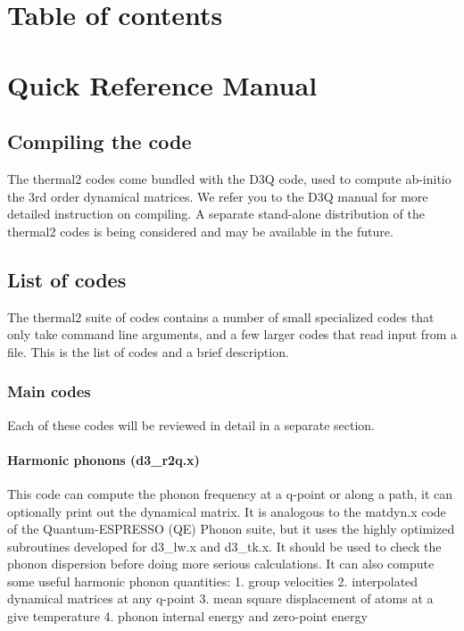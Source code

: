 \documentclass[
]{article}
\begin{document}
\hypertarget{table-of-contents}{%
\section{Table of contents}\label{table-of-contents}}

\hypertarget{quick-reference-manual}{%
\section{Quick Reference Manual}\label{quick-reference-manual}}

\hypertarget{compiling-the-code}{%
\subsection{Compiling the code}\label{compiling-the-code}}

The thermal2 codes come bundled with the D3Q code, used to compute
ab-initio the 3rd order dynamical matrices. We refer you to the D3Q
manual for more detailed instruction on compiling. A separate
stand-alone distribution of the thermal2 codes is being considered and
may be available in the future.

\hypertarget{list-of-codes}{%
\subsection{List of codes}\label{list-of-codes}}

The thermal2 suite of codes contains a number of small specialized codes
that only take command line arguments, and a few larger codes that read
input from a file. This is the list of codes and a brief description.

\hypertarget{main-codes}{%
\subsubsection{Main codes}\label{main-codes}}

Each of these codes will be reviewed in detail in a separate section.

\hypertarget{harmonic-phonons-d3_r2q.x}{%
\paragraph{Harmonic phonons
(d3\_r2q.x)}\label{harmonic-phonons-d3_r2q.x}}

This code can compute the phonon frequency at a q-point or along a path,
it can optionally print out the dynamical matrix. It is analogous to the
matdyn.x code of the Quantum-ESPRESSO (QE) Phonon suite, but it uses the
highly optimized subroutines developed for d3\_lw.x and d3\_tk.x. It
should be used to check the phonon dispersion before doing more serious
calculations. It can also compute some useful harmonic phonon
quantities: 1. group velocities 2. interpolated dynamical matrices at
any q-point 3. mean square displacement of atoms at a give temperature
4. phonon internal energy and zero-point energy
\end{document}
